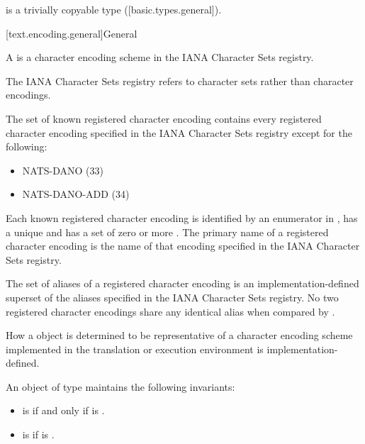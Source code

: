 \documentclass{wg21}
\begin{document}
\begin{addedblock}


 is a trivially copyable type ([basic.types.general]).

[text.encoding.general]{General}

\pnum A  is a character encoding scheme in the IANA Character Sets registry.
\begin{note}
    The IANA Character Sets registry refers to character sets rather than character encodings.
\end{note}



The set of known registered character encoding contains every registered character encoding specified in the IANA Character Sets registry except for the following:
\begin{itemize}
\item NATS-DANO (33)
\item NATS-DANO-ADD	(34)
\end{itemize}

Each known registered character encoding is identified by an enumerator in , has a unique  and has a set of zero or more .
The primary name of a registered character encoding is the name of that encoding specified in the IANA Character Sets registry.


The set of aliases of a registered character encoding is an implementation-defined superset of the aliases specified in the IANA Character Sets registry.
No two registered character encodings share any identical alias when compared by .


How a  object is determined to be representative of a character encoding scheme implemented in the translation or execution environment is implementation-defined.

An object  of type  maintains the following invariants:
\begin{itemize}
\item {} is  if and only if  is .
\item {} is  if  is .
\end{itemize}


\end{addedblock}
\end{document}
